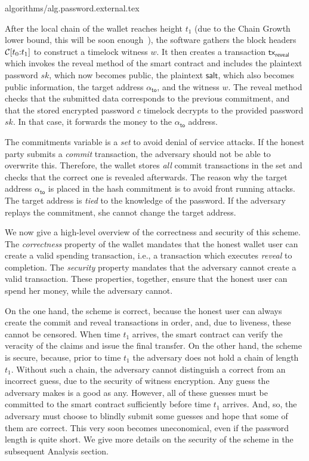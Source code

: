 {algorithms/alg.password.external.tex}

After the local chain of the wallet reaches height $t_1$ (due to the Chain Growth lower bound, this
will be soon enough~\cite{backbone}), the software gathers the block headers
$\mathcal{C}[t_0{:}t_1]$ to construct a timelock witness $w$. It then creates a transaction
$\textsf{tx}_\textsf{reveal}$ which invokes the \textsf{reveal} method of the smart contract
and includes the plaintext password $sk$, which now becomes public, the plaintext
$\textsf{salt}$, which also becomes public information, the target address $\alpha_{\textsf{to}}$, and
the witness $w$. The \textsf{reveal} method checks that the submitted data corresponds to the
previous commitment, and that the stored encrypted password $c$ timelock decrypts to the provided
password $sk$. In that case, it forwards the money to the $\alpha_{\textsf{to}}$ address.

The \textsf{commitments} variable is a \emph{set} to avoid denial of service attacks.
If the honest party submits a \emph{commit} transaction, the adversary should not be
able to overwrite this. Therefore, the wallet stores \emph{all} commit transactions in
the set and checks that the correct one is revealed afterwards. The reason why the
target address $\alpha_\textsf{to}$ is placed in the hash commitment is to avoid front
running attacks. The target address is \emph{tied} to the knowledge of the password.
If the adversary replays the commitment, she cannot change the target address.

We now give a high-level overview of the correctness and security of this scheme.
The \emph{correctness} property of the wallet mandates that the honest wallet user can
create a valid spending transaction, i.e., a transaction which executes
\emph{reveal} to completion. The \emph{security} property mandates that the adversary
cannot create a valid transaction. These properties, together, ensure that the honest user
can spend her money, while the adversary cannot.

On the one hand, the scheme is correct, because the honest user can always create the commit
and reveal transactions in order, and, due to liveness, these cannot be censored. When time
$t_1$ arrives, the smart contract can verify the veracity of the claims and issue the final
transfer. On the other hand, the scheme is secure, because, prior to time $t_1$ the adversary
does not hold a chain of length $t_1$. Without such a chain, the adversary cannot distinguish
a correct from an incorrect guess, due to the security of witness encryption. Any guess the
adversary makes is a good as any. However, all of these guesses must be committed to the smart
contract sufficiently before time $t_1$ arrives. And, so, the adversary must choose to blindly
submit some guesses and hope that some of them are correct. This very soon becomes uneconomical,
even if the password length is quite short. We give more details on the security of the scheme
in the subsequent Analysis section.

